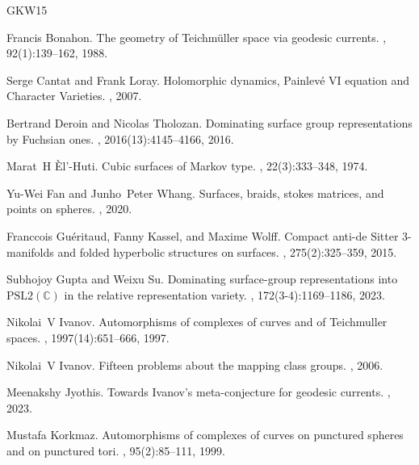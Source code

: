 \documentclass[11pt]{amsart}
\numberwithin{theorem}{section}
\theoremstyle{definition}
\theoremstyle{remark}
\renewcommand{\c}{\textup{c}}
\newcommand{\<}{\langle}
\renewcommand{\>}{\rangle}
\begin{document}
\begin{thebibliography}{GKW15}

Francis Bonahon.
\newblock The geometry of Teichm\"uller space via geodesic currents.
, 92(1):139--162, 1988.

Serge Cantat and Frank Loray.
\newblock Holomorphic dynamics, Painlev\'e VI equation and Character Varieties.
, 2007.

Bertrand Deroin and Nicolas Tholozan.
\newblock Dominating surface group representations by Fuchsian ones.
, 2016(13):4145--4166, 2016.

Marat~H {\`E}l'-Huti.
\newblock Cubic surfaces of Markov type.
, 22(3):333--348, 1974.

Yu-Wei Fan and Junho~Peter Whang.
\newblock Surfaces, braids, stokes matrices, and points on spheres.
, 2020.

Fran{\c{c}}ois Gu{\'e}ritaud, Fanny Kassel, and Maxime Wolff.
\newblock Compact anti-de Sitter 3-manifolds and folded hyperbolic structures on surfaces.
, 275(2):325--359, 2015.

Subhojoy Gupta and Weixu Su.
\newblock Dominating surface-group representations into $\mathrm{PSL}2(\mathbb{C})$ in the relative representation variety.
, 172(3-4):1169--1186, 2023.

Nikolai~V Ivanov.
\newblock Automorphisms of complexes of curves and of Teichmuller spaces.
, 1997(14):651--666, 1997.

Nikolai~V Ivanov.
\newblock Fifteen problems about the mapping class groups.
, 2006.

Meenakshy Jyothis.
\newblock Towards Ivanov's meta-conjecture for geodesic currents.
, 2023.

Mustafa Korkmaz.
\newblock Automorphisms of complexes of curves on punctured spheres and on punctured tori.
, 95(2):85--111, 1999.


\end{thebibliography}
\end{document}
